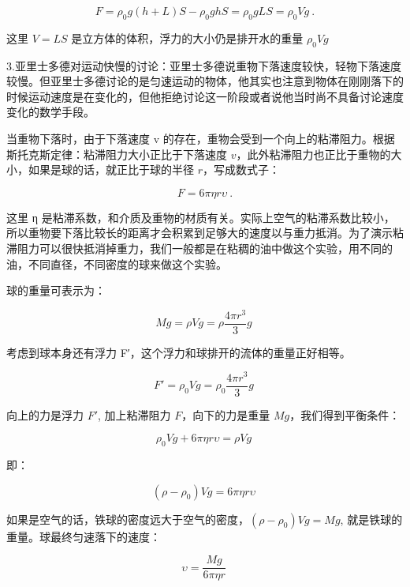\begin{equation}
F = \rho_0 g(h+L)S -\rho_0 gh S=\rho_0 gLS= \rho_0 V g~.
\end{equation}

这里 $V=LS$ 是立⽅体的体积，浮⼒的⼤小仍是排开⽔的重量 $\rho_0 V g$

3.亚里⼠多德对运动快慢的讨论：亚里⼠多德说重物下落速度较快，轻物下落速度较慢。但亚里⼠多德讨论的是匀速运动的物体，他其实也注意到物体在刚刚落下的时候运动速度是在变化的，但他拒绝讨论这⼀阶段或者说他当时尚不具备讨论速度变化的数学⼿段。

当重物下落时，由于下落速度 v 的存在，重物会受到⼀个向上的粘滞阻⼒。根据斯托克斯定律：粘滞阻⼒⼤小正比于下落速度 $v$，此外粘滞阻⼒也正比于重物的⼤小，如果是球的话，就正比于球的半径 $r$，写成数式⼦：

\begin{equation}
F = 6\pi\eta r \upsilon~.
\end{equation}

这里 η 是粘滞系数，和介质及重物的材质有关。实际上空⽓的粘滞系数比较小，所以重物要下落比较长的距离才会积累到⾜够⼤的速度以与重⼒抵消。为了演示粘滞阻⼒可以很快抵消掉重⼒，我们⼀般都是在粘稠的油中做这个实验，用不同的油，不同直径，不同密度的球来做这个实验。

球的重量可表示为：

\begin{equation}
M g = \rho V g= \rho \frac{4 \pi r^3 }{3}g~
\end{equation}

考虑到球本身还有浮⼒ F′，这个浮⼒和球排开的流体的重量正好相等。

\begin{equation}
F' = \rho_0 V g = \rho_0\frac{4 \pi r^3 }{3}g ~
\end{equation}

向上的⼒是浮⼒ $F'$, 加上粘滞阻⼒ $F$，向下的⼒是重量 $Mg$，我们得到平衡条件：

\begin{equation}
\rho_0 V g+6\pi\eta r \upsilon = \rho V g ~
\end{equation}

即：

\begin{equation}
(\rho-\rho_0)V g=6\pi\eta r \upsilon ~
\end{equation}

如果是空⽓的话，铁球的密度远⼤于空⽓的密度，$(\rho-\rho_0)V g=M g$, 就是铁球的重量。球最终匀速落下的速度：


\begin{equation}
\upsilon=\frac{M g}{6\pi\eta r }~
\end{equation}


